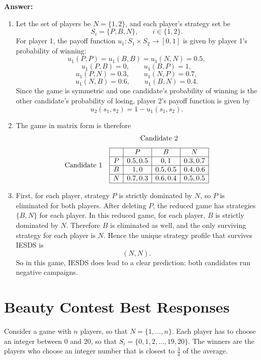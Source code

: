 \documentclass[12pt,a4paper]{article}
\begin{document}
\noindent\textbf{Answer:}
\begin{enumerate}[label=(\alph*)]
  \item Let the set of players be $N = \{1,2\}$, and each player's strategy set be
  \[
    S_i=\{P,B,N\},\qquad i\in\{1,2\}.
  \]
  For player 1, the payoff function $u_1:S_1\times S_2\to[0,1]$ is given by player 1's probability of winning:
  \[
    u_1(P,P)=u_1(B,B)=u_1(N,N)=0.5,
  \]
  \[
    u_1(P,B)=0,\qquad u_1(B,P)=1,
  \]
  \[
    u_1(P,N)=0.3,\qquad u_1(N,P)=0.7,
  \]
  \[
    u_1(N,B)=0.6,\qquad u_1(B,N)=0.4.
  \]
  Since the game is symmetric and one candidate's probability of winning is the other candidate's probability of losing, player 2's payoff function is given by
  \[
    u_2(s_1,s_2)=1-u_1(s_1,s_2).
  \]

  \item The game in matrix form is therefore
  \[
  \begin{array}{c@{\hspace{1em}}c}
  & \text{Candidate 2} \\[0.7em]
  \text{Candidate 1} &
  \begin{array}{|c|c|c|c|}
    \hline
    & P & B & N \\
    \hline
    P & 0.5,0.5 & 0,1 & 0.3,0.7 \\
    \hline
    B & 1,0 & 0.5,0.5 & 0.4,0.6 \\
    \hline
    N & 0.7,0.3 & 0.6,0.4 & 0.5,0.5 \\
    \hline
  \end{array}
  \end{array}
  \]

  \item First, for each player, strategy $P$ is strictly dominated by $N$, so $P$ is eliminated for both players. After deleting $P$, the reduced game has strategies $\{B,N\}$ for each player. In this reduced game, for each player, $B$ is strictly dominated by $N$. Therefore $B$ is eliminated as well, and the only surviving strategy for each player is $N$. Hence the unique strategy profile that survives IESDS is
  \[
    (N,N).
  \]
  So in this game, IESDS does lead to a clear prediction: both candidates run negative campaigns.
\end{enumerate}

\section{Beauty Contest Best Responses}
Consider a game with $n$ players, so that $N = \{1,\dots, n\}$. Each player has to choose an integer between 0 and 20, so that $S_i = \{0, 1, 2,\dots, 19, 20\}$. The winners are the players who choose an integer number that is closest to $\frac{3}{4}$ of the average.
\end{document}
